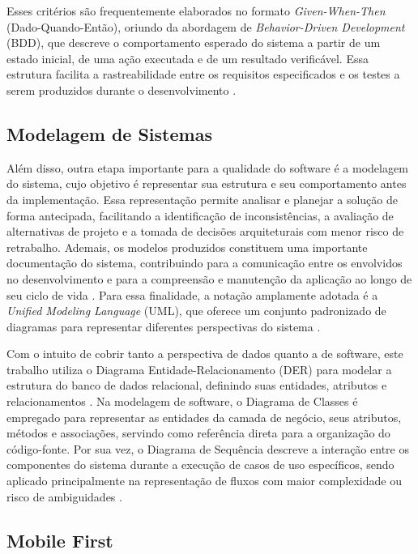 Esses critérios são frequentemente elaborados no formato \textit{Given-When-Then} (Dado-Quando-Então), oriundo da abordagem de \textit{Behavior-Driven Development} (BDD), que descreve o comportamento esperado do sistema a partir de um estado inicial, de uma ação executada e de um resultado verificável. Essa estrutura facilita a rastreabilidade entre os requisitos especificados e os testes a serem produzidos durante o desenvolvimento \cite{north2006}.
 
\subsection{Modelagem de Sistemas}
 
Além disso, outra etapa importante para a qualidade do software é a modelagem do sistema, cujo objetivo é representar sua estrutura e seu comportamento antes da implementação. Essa representação permite analisar e planejar a solução de forma antecipada, facilitando a identificação de inconsistências, a avaliação de alternativas de projeto e a tomada de decisões arquiteturais com menor risco de retrabalho. Ademais, os modelos produzidos constituem uma importante documentação do sistema, contribuindo para a comunicação entre os envolvidos no desenvolvimento e para a compreensão e manutenção da aplicação ao longo de seu ciclo de vida \cite{sommerville2019}. Para essa finalidade, a notação amplamente adotada é a \textit{Unified Modeling Language} (UML), que oferece um conjunto padronizado de diagramas para representar diferentes perspectivas do sistema \cite{booch2005}.

Com o intuito de cobrir tanto a perspectiva de dados quanto a de software, este trabalho utiliza o Diagrama Entidade-Relacionamento (DER) para modelar a estrutura do banco de dados relacional, definindo suas entidades, atributos e relacionamentos \cite{elmasri2016fundamentals}. Na modelagem de software, o Diagrama de Classes é empregado para representar as entidades da camada de negócio, seus atributos, métodos e associações, servindo como referência direta para a organização do código-fonte. Por sua vez, o Diagrama de Sequência descreve a interação entre os componentes do sistema durante a execução de casos de uso específicos, sendo aplicado principalmente na representação de fluxos com maior complexidade ou risco de ambiguidades \cite{sommerville2019, booch2005}.
 
\subsection{Mobile First}
 
